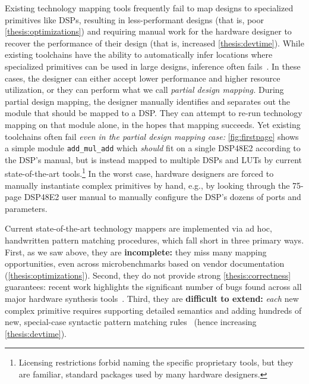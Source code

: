 Existing technology mapping tools
  frequently fail to map designs
  to
  specialized primitives like DSPs,
  resulting in less-performant designs
  (that is, poor \cref{thesis:optimizations})
  and
  requiring manual work for the hardware designer
  to recover the performance of their design
  (that is, increased \cref{thesis:devtime}).
While existing toolchains
  have the ability to automatically infer
  locations where specialized primitives
  can be used in large designs,
  inference often fails~\cite{xilinxforum1,xilinxforum2,inferringreddit}.
In these cases, the designer can either
  accept lower performance and higher resource
  utilization,
  or they can perform
  what we call
  \textit{partial design mapping.}
During partial design mapping, 
  the designer
  manually identifies and separates out
  the module that should be mapped
  to a DSP.
They can attempt to re-run technology mapping
  on that module alone,
  in the hopes that mapping succeeds.
Yet existing toolchains often fail
  \textit{even in the partial design mapping case:}
  \cref{fig:firstpage} shows a
  simple module
  \texttt{add\_mul\_add}
  which \textit{should} fit on a single DSP48E2
  according to the DSP's manual,
  but is instead mapped to multiple DSPs and LUTs
  by current state-of-the-art tools.\footnote{
    Licensing restrictions forbid naming the
    specific proprietary tools, but they are familiar,
    standard packages used by many hardware designers.
  }
In the worst case,
  hardware designers are forced to manually
  instantiate complex primitives by hand,
  e.g., by looking through the 75-page
  DSP48E2 user manual
  to manually configure the DSP's dozens
  of ports and parameters.

Current state-of-the-art
  technology mappers 
  are implemented via
  ad hoc, handwritten pattern matching procedures,
  which
  fall short in three primary ways.
First,
  as we saw above,
  they are \textbf{incomplete:}
  they miss many mapping opportunities,
  even across microbenchmarks based on vendor documentation
  (\cref{thesis:optimizations}).
Second, they do not provide strong \cref{thesis:correctness} guarantees:
  recent work highlights the significant number of bugs found across 
  all major hardware synthesis tools~\cite{herklotz2020finding}.
Third, they are \textbf{difficult to extend:}
  \textit{each} new complex primitive requires
  supporting detailed semantics
  and adding hundreds of new, special-case
  syntactic pattern matching rules~\cite{wolf2013yosys}
  (hence increasing \cref{thesis:devtime}).



